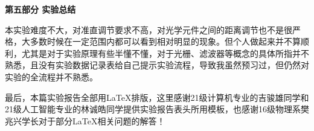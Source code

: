 \documentclass[12pt]{article}
\begin{document}

\begin{center}
    {\Large \textbf{第五部分 \quad 实验总结}}
\end{center}

本实验难度不大，对准直调节要求不高，对光学元件之间的距离调节也不是很严格，大多数时候在一定范围内都可以看到相对明显的现象。但个人做起来并不算顺利，尤其是对于实验原理有些半懂不懂，对于光栅、滤波器等概念的具体所指并不熟悉，且没有实验数据记录表给自己提示实验流程，导致我虽然预习过，但仍然对实验的全流程并不熟悉。

最后，本篇实验报告全部用\LaTeX{}排版，这里感谢21级计算机专业的吉骏雄同学和21级人工智能专业的林诚皓同学提供实验报告表头所用模板，也感谢16级物理系樊兆兴学长对于部分\LaTeX{}相关问题的解答！
\end{document}
